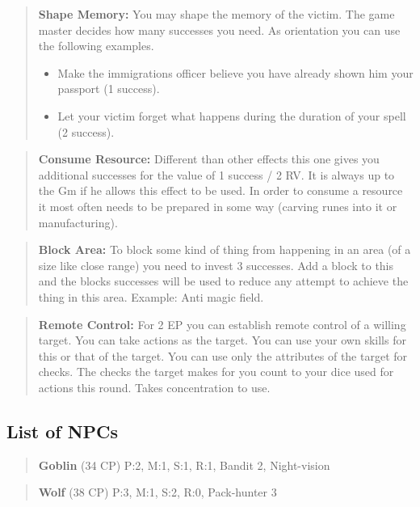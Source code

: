\documentclass[11pt]{article}
\begin{document}
{\begin{multicols}{2}[]
\begin{quote}
\textbf{Shape Memory:} You may shape the memory of the victim. The game master decides how many successes you need. As orientation you can use the following examples.
\begin{itemize}
\item Make the immigrations officer believe you have already shown him your passport (1 success).
\item Let your victim forget what happens during the duration of your spell (2 success).
\end{itemize}
\end{quote}

\begin{quote}
\textbf{Consume Resource:} Different than other effects this one gives you additional successes for the value of 1 success / 2 RV. It is always up to the Gm if he allows this effect to be used. In order to consume a resource it most often needs to be prepared in some way (carving runes into it or manufacturing).
\end{quote}

\begin{quote}
\textbf{Block Area:} To block some kind of thing from happening in an area (of a size like close range) you need to invest 3 successes. Add a block to this and the blocks successes will be used to reduce any attempt to achieve the thing in this area.
Example: Anti magic field.
\end{quote}

\begin{quote}
\textbf{Remote Control:} For 2 EP you can establish remote control of a willing target. You can take actions as the target. You can use your own skills for this or that of the target. You can use only the attributes of the target for checks. The checks the target makes for you count to your dice used for actions this round. Takes concentration to use. 
\end{quote}

\subsection{List of NPCs}
\label{sec:org150e960}
\begin{quote}
\textbf{Goblin} (34 CP)
P:2, M:1, S:1, R:1, Bandit 2, Night-vision
\end{quote}

\begin{quote}
\textbf{Wolf} (38 CP)
P:3, M:1, S:2, R:0, Pack-hunter 3
\end{quote}


\end{multicols}}
\end{document}
